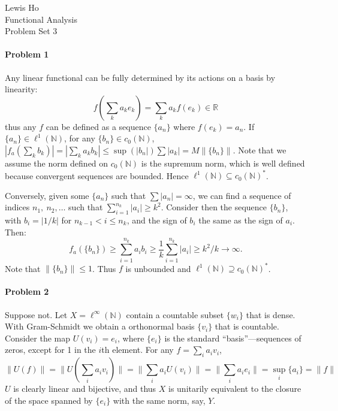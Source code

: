 \documentclass[12pt]{article}
\newcommand{\N}{\mathbb{N}}
\begin{document}
\begin{center}
  Lewis Ho\\
  Functional Analysis\\
  Problem Set 3
\end{center}

\paragraph{Problem 1}

Any linear functional can be fully determined by its actions on a basis by
linearity:
\begin{displaymath}
  f\left(\sum_ka_ke_k\right) = \sum_k a_kf(e_k) \in \mathbb{R}
\end{displaymath}
thus any $f$ can be defined as a sequence $\{a_n\}$ where $f(e_k) = a_n$. If
$\{a_n\} \in \ell^1(\mathbb{N})$, for any $\{b_n\} \in c_0(\N)$, $|f_{a}
(\sum_kb_k)| = |\sum_ka_kb_k| \leq \sup(|b_n|)\sum|a_k|  = M\|\{b_n\}\|$. 
Note that we assume the norm defined on $c_0(\N)$ is the supremum norm, which
is well defined because convergent sequences are bounded.
 Hence $\ell^1(\N) \subseteq
c_0(\N)^*$.

Conversely, given some $\{a_n\}$ such that $\sum|a_n| = \infty$, we can find a
sequence of indices $n_1,\ n_2,\ldots$ such that $\sum_{i=1}^{n_k}|a_i| \geq
k^2$. Consider then the sequence $\{b_n\}$, with $b_i = |1/k|$ for $n_{k-1} <
i \leq n_k$, and the sign of $b_i$ the same as the sign of $a_i$. Then:
\begin{displaymath}
  f_a(\{b_n\}) \geq \sum_{i=1}^{n_k}a_ib_i \geq \frac{1}{k}\sum_{i=1}^{n_k}|a_i|
  \geq k^2/k \to \infty.
\end{displaymath}
Note that $\|\{b_n\}\| \leq 1$.
Thus $f$ is unbounded and $\ell^1(\N) \supseteq c_0(\N)^*$.

\paragraph{Problem 2}

Suppose not. Let $X=\ell^\infty(\N)$ contain a countable subset $\{w_i\}$ that is
dense. With Gram-Schmidt we obtain a orthonormal basis $\{v_i\}$ that is
countable. Consider the map $U(v_i) = e_i$, where $\{e_i\}$ is the standard
``basis''---sequences of zeros, except for 1 in the $i$th element. For any
$f = \sum_ia_iv_i$,
\begin{displaymath}
  \|U(f)\| = \|U(\sum_ia_iv_i)\| = \|\sum_ia_iU(v_i)\|
  = \|\sum_ia_ie_i\| = \sup_i\{a_i\} = \|f\|
\end{displaymath}
$U$ is clearly linear and bijective, and thus
$X$ is unitarily equivalent to the closure of the space spanned
by $\{e_i\}$ with the same norm, say, $Y$.
\end{document}
